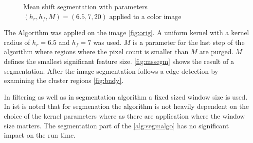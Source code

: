 \begin{figure}[ht]
\centering
{}%
%
%

\caption{Mean shift segmentation with parameters $(h_r, h_f, M) = (6.5, 7, 20)$
		 applied to a color image}
\label{fig:mssegm}
\end{figure}


The Algorithm was applied on the image \autoref{fig:orig}. A uniform kernel with
a kernel radius of $h_r = 6.5$ and $h_f = 7$ was used. $M$ is a parameter for
the last step of the algorithm where regions where the pixel count is smaller
than $M$ are purged. $M$ defines the smallest significant feature size.
\autoref{fig:mssegm} shows the result of a segmentation. After the image
segmentation follows a edge detection by examining the cluster regions
\autoref{fig:bndy}.

In filtering as well as in segmentation algorithm a fixed sized window size is 
used. In \citeauthor{citeulike:462300} \citep{citeulike:462300} ist is noted
that for segmenation the algorithm is not heavily dependent on the choice of the
kernel parameters where as there are application where the window size matters. 
The segmentation part of the \autoref{alg:segmalgo} has no significant impact on the 
run time. 

